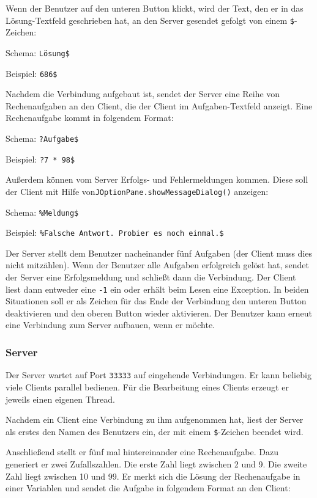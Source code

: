 Wenn der Benutzer auf den unteren Button klickt, wird der Text, den er in das
Lösung-Textfeld geschrieben hat, an den Server gesendet gefolgt von einem
\lstinline|$|-Zeichen:

Schema:  \lstinline|Lösung$|

Beispiel: \lstinline|686$|

Nachdem die Verbindung aufgebaut ist, sendet der Server eine Reihe von
Rechenaufgaben an den Client, die der Client im Aufgaben-Textfeld anzeigt. Eine
Rechenaufgabe kommt in folgendem Format:

Schema: \lstinline|?Aufgabe$|	

Beispiel: \lstinline|?7 * 98$|

Außerdem können vom Server Erfolgs- und Fehlermeldungen kommen. Diese soll der
Client mit Hilfe von\linebreak \lstinline|JOptionPane.showMessageDialog()|
anzeigen:

Schema: \lstinline|%Meldung$|	

Beispiel: \lstinline|%Falsche Antwort. Probier es noch einmal.$|

Der Server stellt dem Benutzer nacheinander fünf Aufgaben (der Client muss dies
nicht mitzählen). Wenn der Benutzer alle Aufgaben erfolgreich gelöst hat,
sendet der Server eine Erfolgsmeldung und schließt dann die Verbindung. Der
Client liest dann entweder eine \lstinline|-1| ein oder erhält beim Lesen eine
Exception. In beiden Situationen soll er als Zeichen für das Ende der Verbindung
den unteren Button deaktivieren und den oberen Button wieder aktivieren. Der
Benutzer kann erneut eine Verbindung zum Server aufbauen, wenn er möchte.

\subsubsection{Server}

Der Server wartet auf Port \lstinline|33333| auf eingehende Verbindungen. Er
kann beliebig viele Clients parallel bedienen. Für die Bearbeitung eines
Clients erzeugt er jeweils einen eigenen Thread.

Nachdem ein Client eine Verbindung zu ihm aufgenommen hat, liest der Server als
erstes den Namen des Benutzers ein, der mit einem \lstinline|$|-Zeichen
beendet wird.

Anschließend stellt er fünf mal hintereinander eine Rechenaufgabe. Dazu
generiert er zwei Zufallszahlen. Die erste Zahl liegt zwischen 2 und 9. Die
zweite Zahl liegt zwischen 10 und 99. Er merkt sich die Lösung der
Rechenaufgabe in einer Variablen und sendet die Aufgabe in folgendem Format an
den Client:

